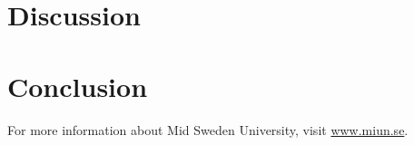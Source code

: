 \documentclass{miun}
\begin{document}
\lipsum[17]

\section{Discussion}

\lipsum[18-19]

\section{Conclusion}

\lipsum[20]

For more information about Mid Sweden University, visit
\href{https://www.miun.se}{www.miun.se}.
\end{document}
